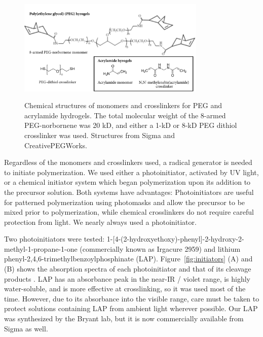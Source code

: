 \begin{figure}
\caption{Chemical structures of monomers and crosslinkers for PEG and acrylamide hydrogels. The total molecular weight of the 8-armed PEG-norbornene was 20 kD, and either a 1-kD or 8-kD PEG dithiol crosslinker was used.  Structures from Sigma and CreativePEGWorks.}
\centering
\includegraphics[width=0.8\textwidth]{figs/ch03/monomer-and-crosslinker}
\label{fig:monomer-crosslinker}
\end{figure}

Regardless of the monomers and crosslinkers used, a radical generator is needed to initiate polymerization.  We used either a photoinitiator, activated by UV light, or a chemical initiator system which began polymerization upon its addition to the precursor solution.  Both systems have advantages: Photoinitiators are useful for patterned polymerization using photomasks and allow the precursor to be mixed prior to polymerization, while chemical crosslinkers do not require careful protection from light.  We nearly always used a photoinitiator.

Two photoinitiators were tested: 1-[4-(2-hydroxyethoxy)-phenyl]-2-hydroxy-2-methyl-1-propane-1-one (commercially known as Irgacure 2959) and lithium phenyl-2,4,6-trimethylbenzoylphosphinate (LAP). %
Figure~\ref{fig:initiators} (A) and (B) shows the absorption spectra of each photoinitiator and that of its cleavage products \cite{fairbanks09}.  LAP has an absorbance peak in the near-IR / violet range, is highly water-soluble, and is more effective at crosslinking, so it was used most of the time.  However, due to its absorbance into the visible range, care must be taken to protect solutions containing LAP from ambient light wherever possible.  Our LAP was synthesized by the Bryant lab, but it is now commercially available from Sigma as well.


